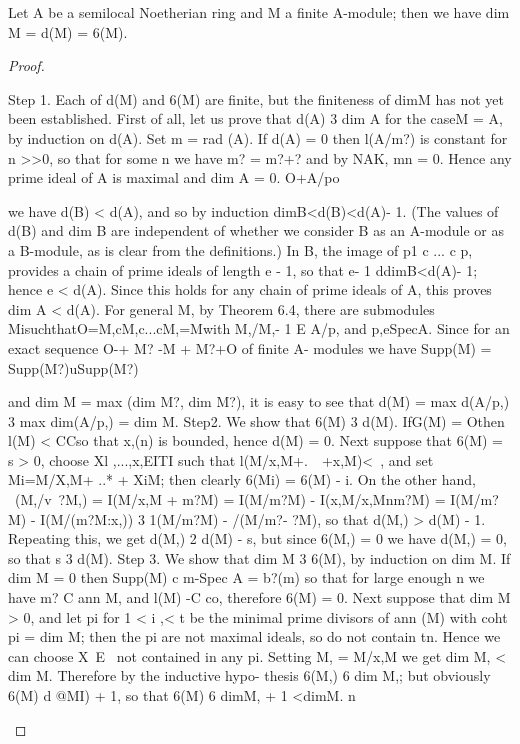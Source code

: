 \begin{theorem}[Theorem 13.4]\label{mcrt-auto-theorem-13-4}
\begin{mathematicalrecord}
Let A be a semilocal Noetherian ring and M a finite
A-module; then we have
         dim M = d(M) = 6(M).
\end{mathematicalrecord}
\end{theorem}
\begin{proof}
\begin{mathematicalrecord}
Step 1. Each of d(M) and 6(M) are finite, but the finiteness of dimM
has not yet been established. First of all, let us prove that d(A) 3 dim A
for the caseM = A, by induction on d(A). Set m = rad (A). If d(A) = 0 then
l(A/m?) is constant for n >>0, so that for some n we have m? = m?+? and
by NAK, mn = 0. Hence any prime ideal of A is maximal and dim A = 0.
O+A/po    %

we have d(B) < d(A), and so by induction
         dimB<d(B)<d(A)-              1.
(The values of d(B) and dim B are independent of whether we consider B as
an A-module or as a B-module, as is clear from the definitions.) In B, the
image of p1 c ... c p, provides a chain of prime ideals of length e - 1, so that
         e- 1 ddimB<d(A)-          1;
hence e < d(A). Since this holds for any chain of prime ideals of A, this
proves dim A < d(A). For general M, by Theorem 6.4, there are submodules
MisuchthatO=M,cM,c...cM,=Mwith
         M,/M,-    1 E A/p,    and         p,eSpecA.
Since for an exact         sequence        O-+ M? -M      +      M?+O      of finite   A-
modules we have
         Supp(M)       = Supp(M?)uSupp(M?)

and
         dim M = max (dim M?, dim M?),
it is easy to see that
         d(M) = max {d(A/p,)}         3 max {dim(A/p,)}         = dim M.
 Step2. We show that 6(M) 3 d(M). IfG(M) = Othen l(M) < CCso that x,(n)
is bounded, hence d(M) = 0. Next suppose that 6(M) = s > 0, choose
Xl ,...,x,EITI such that l(M/x,M+.~~+x,M)<~,      and set Mi=M/X,M+
..* + XiM; then clearly 6(Mi) = 6(M) - i. On the other hand,
         ~(M,/v~?M,)      = I(M/x,M        + m?M)
                          = I(M/m?M)         - I(x,M/x,Mnm?M)
                          = I(M/m?M)        - I(M/(m?M:x,))
                          3 1(M/m?M)        - /(M/m?- ?M),
so that d(M,) > d(M) - 1. Repeating this, we get d(M,) 2 d(M) - s, but since
6(M,) = 0 we have d(M,) = 0, so that s 3 d(M).
   Step 3. We show that dim M 3 6(M), by induction on dim M. If dim M = 0
then Supp(M) c m-Spec A = b?(m) so that for large enough n we have
m? C ann M, and l(M) -C co, therefore 6(M) = 0. Next suppose that
dim M > 0, and let pi for 1 < i ,< t be the minimal prime divisors of ann (M)
with coht pi = dim M; then the pi are not maximal ideals, so do not contain
tn. Hence we can choose X~E~ not contained in any pi. Setting
M, = M/x,M we get dim M, < dim M. Therefore by the inductive hypo-
thesis 6(M,) 6 dim M,; but obviously 6(M) d @MI) + 1, so that 6(M) 6
dimM, + 1 <dimM.        n
\end{mathematicalrecord}
\end{proof}


